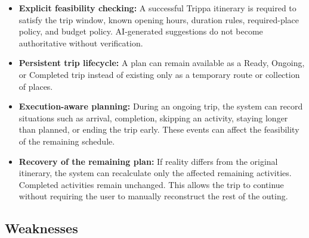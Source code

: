 \begin{itemize}
\item \textbf{Explicit feasibility checking:} A successful Trippa itinerary is required to satisfy the trip window, known opening hours, duration rules, required-place policy, and budget policy. AI-generated suggestions do not become authoritative without verification. \sourcetbd{}
\item \textbf{Persistent trip lifecycle:} A plan can remain available as a Ready, Ongoing, or Completed trip instead of existing only as a temporary route or collection of places.
\item \textbf{Execution-aware planning:} During an ongoing trip, the system can record situations such as arrival, completion, skipping an activity, staying longer than planned, or ending the trip early. These events can affect the feasibility of the remaining schedule. \sourcetbd{}
\item \textbf{Recovery of the remaining plan:} If reality differs from the original itinerary, the system can recalculate only the affected remaining activities. Completed activities remain unchanged. This allows the trip to continue without requiring the user to manually reconstruct the rest of the outing. \sourcetbd{}
\end{itemize}


\subsection{Weaknesses}

